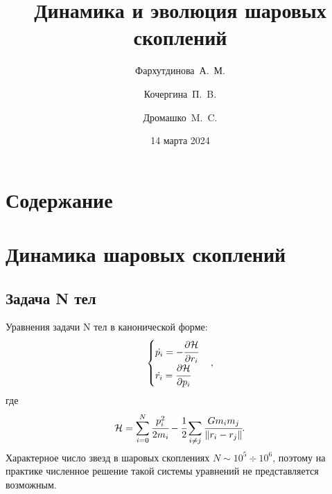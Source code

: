\documentclass{beamer}
\begin{document}
\title{Динамика и эволюция шаровых скоплений}
\author{Фархутдинова~А.~М. \and Кочергина~П.~B. \and Дромашко~M.~C.}
\date{14 марта 2024}
\maketitle
\section*{Содержание}
\begin{frame}
    \tableofcontents
\end{frame}
\section{Динамика шаровых скоплений}
\subsection{Задача N тел}
\begin{frame}
    Уравнения задачи N тел в канонической форме:
    \begin{equation*}
        \begin{cases}
            \dot{p_i} = -\cfrac{\partial \mathcal{H}}{\partial r_i}\\
            \dot{r_i} = \cfrac{\partial \mathcal{H} }{\partial p_i}
        \end{cases},
    \end{equation*}
    где 
    \begin{equation*}
        \mathcal{H} = \sum_{i=0}^{N} \cfrac{p_i^2}{2m_i} - \cfrac{1}{2}\sum_{i \neq j} \cfrac{Gm_im_j}{\Vert r_i - r_j \Vert}.
    \end{equation*}
    Характерное число звезд в шаровых скоплениях $N \sim 10^5 \div 10^6$, поэтому на практике численное решение такой системы уравнений не представляется
    возможным. 
\end{frame}
\end{document}
